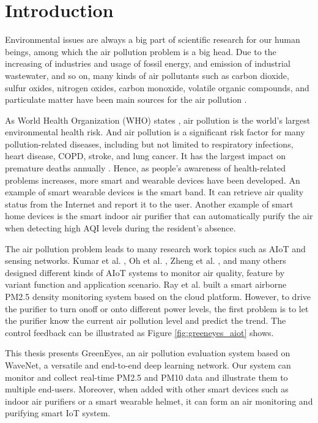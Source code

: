 \chapter{Introduction}

Environmental issues are always a big part of scientific research for our human beings, among which the air pollution problem is a big head. Due to the increasing of industries and usage of fossil energy, and emission of industrial wastewater, and so on, many kinds of air pollutants such as carbon dioxide, sulfur oxides, nitrogen oxides, carbon monoxide, volatile organic compounds, and particulate matter have been main sources for the air pollution \cite{kampa_human_2008}.

As World Health Organization (WHO) states \cite{world2016ambient}, air pollution is the world's largest environmental health risk. And air pollution is a significant risk factor for many pollution-related diseases, including but not limited to respiratory infections, heart disease, COPD, stroke, and lung cancer. It has the largest impact on premature deaths annually \cite{lelieveld2015contribution}. Hence, as people's awareness of health-related problems increases, more smart and wearable devices have been developed. An example of smart wearable devices is the smart band. It can retrieve air quality status from the Internet and report it to the user. Another example of smart home devices is the smart indoor air purifier that can automatically purify the air when detecting high AQI levels during the resident's absence.

The air pollution problem leads to many research work topics such as AIoT and sensing networks. Kumar et al. \cite{kumar2017air}, Oh et al. \cite{oh2015indoor}, Zheng et al. \cite{zheng2016design}, and many others designed different kinds of AIoT systems to monitor air quality, feature by variant function and application scenario. Ray et al. \cite{ray2016internet} built a smart airborne PM2.5 density monitoring system based on the cloud platform. However, to drive the purifier to turn on\/off or onto different power levels, the first problem is to let the purifier know the current air pollution level and predict the trend. The control feedback can be illustrated as Figure \ref{fig:greeneyes_aiot} shows.

This thesis presents GreenEyes, an air pollution evaluation system based on WaveNet, a versatile and end-to-end deep learning network. Our system can monitor and collect real-time PM2.5 and PM10 data and illustrate them to multiple end-users. Moreover, when added with other smart devices such as indoor air purifiers or a smart wearable helmet, it can form an air monitoring and purifying smart IoT system.

